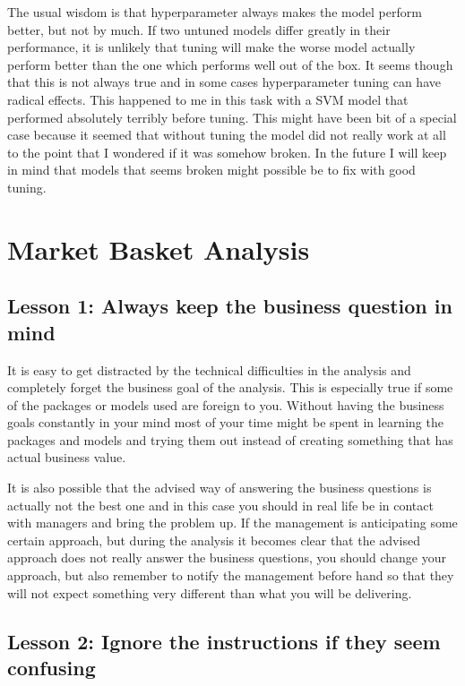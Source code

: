\documentclass[12pt,a4paper,leqno]{report}
\theoremstyle{plain}
\theoremstyle{definition}
\theoremstyle{remark}
\begin{document}
The usual wisdom is that hyperparameter always makes the model perform better, but not by much.
If two untuned models differ greatly in their performance, it is unlikely that tuning
will make the worse model actually perform better than the one which performs well
out of the box. It seems though that this is not always true and in some cases hyperparameter
tuning can have radical effects. This happened to me in this task with a SVM model that
performed absolutely terribly before tuning. This might have been bit of a special case
because it seemed that without tuning the model did not really work at all to the point
that I wondered if it was somehow broken. In the future I will keep in mind that
models that seems broken might possible be to fix with good tuning.

\section{Market Basket Analysis}

\subsection{Lesson 1: Always keep the business question in mind}

It is easy to get distracted by the technical difficulties in the analysis and
completely forget the business goal of the analysis. This is especially true
if some of the packages or models used are foreign to you.
Without having the business goals constantly in your mind most of your time
might be spent in learning the packages and models and trying them out instead of
creating something that has actual business value.

It is also possible that the advised way of answering the business questions
is actually not the best one and in this case you should in real life
be in contact with managers and bring the problem up. If the management
is anticipating some certain approach, but during the analysis it becomes clear
that the advised approach does not really answer the business questions, you should
change your approach, but also remember to notify the management before hand
so that they will not expect something very different than what you
will be delivering.

\subsection{Lesson 2: Ignore the instructions if they seem confusing}
\end{document}
